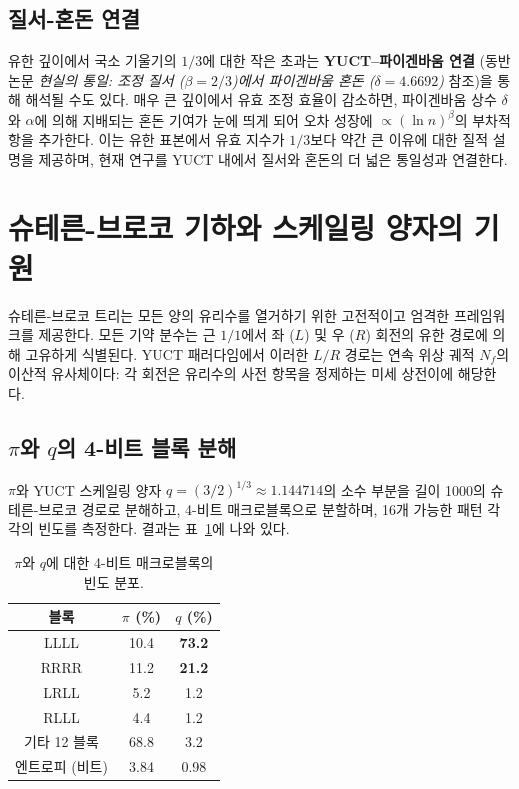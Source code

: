 \documentclass[11pt,a4paper]{article}
\begin{document}
	\subsection{질서-혼돈 연결}
	유한 깊이에서 국소 기울기의 \(1/3\)에 대한 작은 초과는 \textbf{YUCT–파이겐바움 연결} (동반 논문 \emph{현실의 통일: 조정 질서 (\(\beta=2/3\))에서 파이겐바움 혼돈 (\(\delta=4.6692\))} 참조)을 통해 해석될 수도 있다. 매우 큰 깊이에서 유효 조정 효율이 감소하면, 파이겐바움 상수 \(\delta\)와 \(\alpha\)에 의해 지배되는 혼돈 기여가 눈에 띄게 되어 오차 성장에 \(\propto (\ln n)^{\beta}\)의 부차적 항을 추가한다. 이는 유한 표본에서 유효 지수가 \(1/3\)보다 약간 큰 이유에 대한 질적 설명을 제공하며, 현재 연구를 YUCT 내에서 질서와 혼돈의 더 넓은 통일성과 연결한다.
	
	\section{슈테른-브로코 기하와 스케일링 양자의 기원}
	\label{sec:stern-brocot}
	
	슈테른-브로코 트리는 모든 양의 유리수를 열거하기 위한 고전적이고 엄격한 프레임워크를 제공한다. 모든 기약 분수는 근 \(1/1\)에서 좌 (\(L\)) 및 우 (\(R\)) 회전의 유한 경로에 의해 고유하게 식별된다. YUCT 패러다임에서 이러한 \(L/R\) 경로는 연속 위상 궤적 \(N_f\)의 이산적 유사체이다: 각 회전은 유리수의 사전 항목을 정제하는 미세 상전이에 해당한다.
	
	\subsection{\(\pi\)와 \(q\)의 4-비트 블록 분해}
	
	\(\pi\)와 YUCT 스케일링 양자 \(q = (3/2)^{1/3} \approx 1.144714\)의 소수 부분을 길이 1000의 슈테른-브로코 경로로 분해하고, 4-비트 매크로블록으로 분할하며, 16개 가능한 패턴 각각의 빈도를 측정한다. 결과는 표~\ref{tab:block-spectra}에 나와 있다.
	
	\begin{table}[htbp]
		\centering
		\caption{\(\pi\)와 \(q\)에 대한 4-비트 매크로블록의 빈도 분포.}
		\label{tab:block-spectra}
		\begin{tabular}{c c c}
			\toprule
			블록 & \(\pi\) (\%) & \(q\) (\%) \\
			\midrule
			LLLL & 10.4 & \textbf{73.2} \\
			RRRR & 11.2 & \textbf{21.2} \\
			LRLL & 5.2 & 1.2 \\
			RLLL & 4.4 & 1.2 \\
			기타 12 블록 & 68.8 & 3.2 \\
			\midrule
			엔트로피 (비트) & 3.84 & 0.98 \\
			\bottomrule
		\end{tabular}
	\end{table}
	
\end{document}
